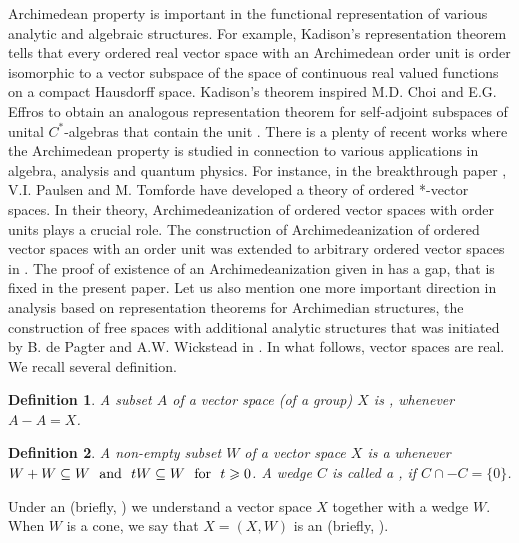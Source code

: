 \documentclass[10pt]{article}
\newtheorem{definition}{Definition}[section]
\begin{document}
\hspace{4mm}
Archimedean property is important in the functional repre\-sentation of various analytic and algebraic structures.
For example, Kadison's representation theorem \cite{Kadison-1951} tells that every ordered real vector space with an Archimedean
order unit is order isomorphic to a vector subspace of the space of continuous real valued functions on a compact Hausdorff space. 
Kadison's theorem inspired M.D. Choi and E.G. Effros to obtain an analogous representation theorem 
for self-adjoint subspaces of unital $C^\ast$-alge\-bras that contain the unit \cite{CE-1977}.
There is a plenty of recent works where the Archimedean property is studied in connection to various applica\-tions in algebra, analysis and quantum physics. 
For instance, in the breakthrough paper \cite{PT-2009}, V.I. Paulsen and M. Tomforde have developed a theory of ordered *-vector spaces.
In their theory, Archimed\-eanization of ordered vector spaces with order units plays a crucial role. 
The const\-ruc\-tion of Archimedeanization of ordered vector spaces with an order unit \cite{PT-2009} was extended to 
arbitrary ordered vector spaces in \cite{E-2017}. The proof of existence of an Archimedeanization given in \cite{E-2017} has a gap, 
that is fixed in the present paper. Let us also mention one more important direction in analysis 
based on represen\-tation theorems for Archimedian structu\-res, the const\-ruction of free spaces with additional analytic structures that 
was initiated by B. de Pagter and A.W. Wickstead in \cite{PW-2015}. In what follows, vector spaces are real. We recall several definition.

\begin{definition}\label{Definition-1_1}
A subset $A$ of a vector space {\em (}of a group{\em )} $X$ is {\color{blue}{generating}}, whenever $A-A=X$.
\end{definition}

\begin{definition}\label{Definition-1_2}
A non-empty subset $W$ of a vector space $X$ is a {\color{blue}{wedge}} whenever 
$W+W\subseteq W \ \ \text{\rm and} \ \ tW\subseteq W \ \ \text{\rm for} \ \ t\geqslant 0$.
A wedge $C$ is called a {\color{blue}{cone}}, if $C\cap -C=\{0\}$.
\end{definition}

\noindent
Under an {\color{blue}{pre-ordered vector space}} (briefly, {\color{blue}{POVS}})
we understand a vector space $X$ together with a wedge $W$. 
When $W$ is a cone, we say that $X=(X,W)$ is an {\color{blue}{ordered vector space}} (briefly, {\color{blue}{OVS}}).
\end{document}
